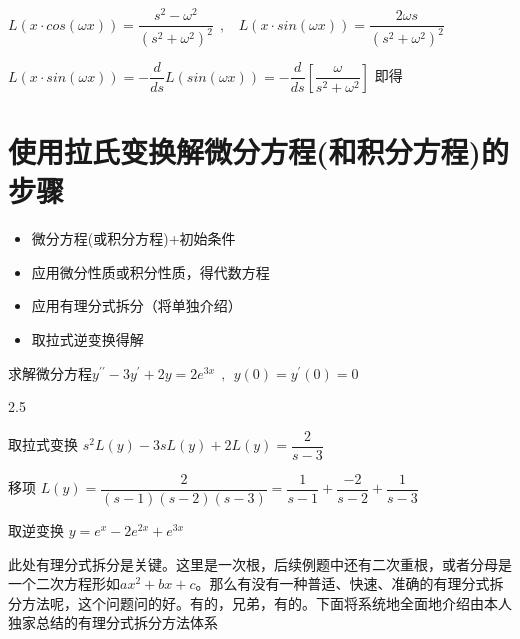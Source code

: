 \vspace{-10pt}

 \hspace{2em} $L\left(x\cdot cos\left(\omega x\right)\right)=\dfrac{s^{2}-\omega^{2}}{\left(s^{2}+\omega^{2}\right)^{2}}\:\:,\:\:\:\:L\left(x\cdot sin\left(\omega x\right)\right)=\dfrac{2\omega s}{\left(s^{2}+\omega^{2}\right)^{2}}$

\begin{center}
	 \hspace{2em} $L\left(x\cdot sin\left(\omega x\right)\right)=-\dfrac{d}{ds}L\left(sin\left(\omega x\right)\right)=-\dfrac{d}{ds}\left\lbrack\dfrac{\omega}{s^{2}+\omega^{2}}\right\rbrack $ 即得
\end{center}

\section{使用拉氏变换解微分方程(和积分方程)的步骤}

\begin{itemize}
	\item 微分方程(或积分方程)+初始条件
	\item 应用微分性质或积分性质，得代数方程
	\item 应用有理分式拆分（将单独介绍）
	\item 取拉式逆变换得解
\end{itemize}

 \hspace{0.5em} 求解微分方程$y^{\prime\prime}-3y^{\prime}+2y=2e^{3x}\:\:,\:\:y\left(0\right)=y^{\prime}\left(0\right)=0$

\vspace{-12pt}

\begin{spacing}{2.5}
	\begin{center}
		 \hspace{0.5em} 取拉式变换 \hspace{0.5em}
		$s^{2}L\left(y\right)-3sL\left(y\right)+2L\left(y\right)=\dfrac{2}{s-3}$
		
		移项 \hspace{0.5em} $L\left(y\right)=\dfrac{2}{\left(s-1\right)\left(s-2\right)\left(s-3\right)}=\dfrac{1}{s-1}+\dfrac{-2}{s-2}+\dfrac{1}{s-3}$
		\label{eg:2-3}
		
		取逆变换 \hspace{0.5em} $y=e^{x}-2e^{2x}+e^{3x}$
	\end{center}
\end{spacing}

\vspace{-10pt}

 \hspace{0.5em} 此处有理分式拆分是关键。这里是一次根，后续例题中还有二次重根，或者分母是一个二次方程形如$ax^{2}+bx+c$。那么有没有一种普适、快速、准确的有理分式拆分方法呢，这个问题问的好。有的，兄弟，有的。下面将系统地全面地介绍由本人独家总结的有理分式拆分方法体系







